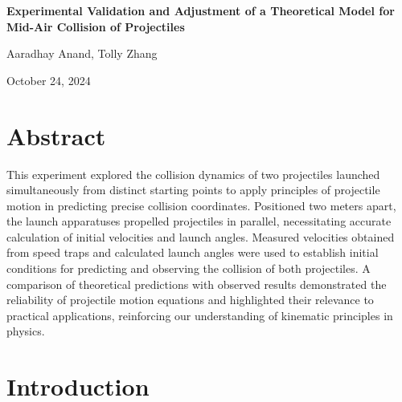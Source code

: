 \documentclass[12pt]{article}
\begin{document}
\begin{titlepage}
    \centering
    \vfill
    \vspace*{2.5in}
    {\Huge\bfseries Experimental Validation and Adjustment of a Theoretical Model for Mid-Air Collision of Projectiles \par}
    \vspace{0.2in}
    {\LARGE Aaradhay Anand, Tolly Zhang\par}
    \vspace{0.2in}
    {\LARGE October 24, 2024 \par}
    \vfill
\end{titlepage}

\newpage

\section{Abstract}
This experiment explored the collision dynamics of two projectiles launched simultaneously from distinct starting points to apply principles of projectile motion in predicting precise collision coordinates. Positioned two meters apart, the launch apparatuses propelled projectiles in parallel, necessitating accurate calculation of initial velocities and launch angles. Measured velocities obtained from speed traps and calculated launch angles were used to establish initial conditions for predicting and observing the collision of both projectiles. A comparison of theoretical predictions with observed results demonstrated the reliability of projectile motion equations and highlighted their relevance to practical applications, reinforcing our understanding of kinematic principles in physics.

\section{Introduction}



\end{document}
